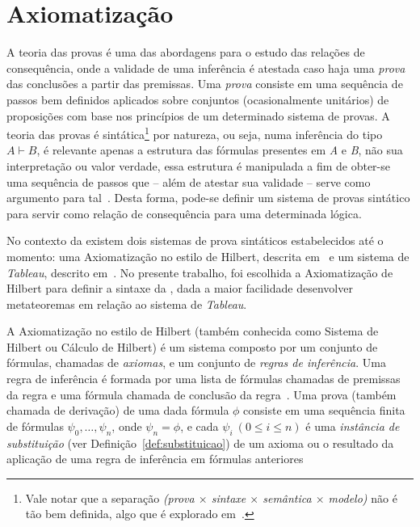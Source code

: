 \section{Axiomatização}
\label{sec:axiomatizacao}

    A teoria das provas é uma das abordagens para o estudo das relações de consequência, onde a validade de uma inferência é atestada caso haja uma \textit{prova} das conclusões a partir das premissas. Uma \textit{prova} consiste em uma sequência de passos bem definidos aplicados sobre conjuntos (ocasionalmente unitários) de proposições com base nos princípios de um determinado sistema de provas. A teoria das provas é sintática\footnote{Vale notar que a separação \textit{(prova {$\times$} sintaxe {$\times$} semântica {$\times$} modelo)} não é tão bem definida, algo que é explorado em~.} por natureza, ou seja, numa inferência do tipo $A \vdash B$, é relevante apenas a estrutura das fórmulas presentes em \textit{A} e \textit{B}, não sua interpretação ou valor verdade, essa estrutura é manipulada a fim de obter-se uma sequência de passos que {--} além de atestar sua validade {--} serve como argumento para tal~\cite{sep-logical-consequence}. Desta forma, pode-se definir um sistema de provas sintático para servir como relação de consequência para uma determinada lógica. 

    No contexto da \lfium{} existem dois sistemas de prova sintáticos estabelecidos até o momento: uma Axiomatização no estilo de Hilbert, descrita em~ e um sistema de \textit{Tableau}, descrito em~. No presente trabalho, foi escolhida a Axiomatização de Hilbert para definir a sintaxe da \lfium{}, dada a maior facilidade desenvolver metateoremas em relação ao sistema de \textit{Tableau}.

    A Axiomatização no estilo de Hilbert (também conhecida como Sistema de Hilbert ou Cálculo de Hilbert) é um sistema composto por um conjunto de fórmulas, chamadas de \textit{axiomas}, e um conjunto de \textit{regras de inferência}. Uma regra de inferência é formada por uma lista de fórmulas chamadas de premissas da regra e uma fórmula chamada de conclusão da regra~\cite{Restall1999-RESAIT-4}. Uma prova (também chamada de derivação) de uma dada fórmula $\phi$ consiste em uma sequência finita de fórmulas \(\psi_0, \dots, \psi_n\), onde \(\psi_n = \phi\), e cada  $\psi_i\ (0 \leq i \leq n)$ é uma \textit{instância de substituição} (ver Definição~\ref{def:substituicao}) de um axioma ou o resultado da aplicação de uma regra de inferência em fórmulas anteriores

